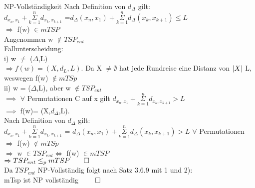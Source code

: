 \documentclass[answers]{submit}
\begin{document}
\begin{exercise}[7]{NP-Vollständigkeit}
{    Nach Definition von $d_{\Delta}$ gilt:  \\

  $d_{x_n,x_1} + \overset{n}{\underset{k=1}{\Sigma}} d_{x_k,x_{k+1}}$ =$d_{\Delta}(x_n,x_1) + \overset{n}{\underset{k=1}{\Sigma}} d_{\Delta}(x_k,x_{k+1}) \leq L$ \\

  $\Rightarrow$ f(w) $\in mTSP$ \\

    Angenommen w $ \notin TSP_{ent} $ \\

    Fallunterscheidung: \\

    i) w $\neq$ ($\Delta$,L) \\

  $\Rightarrow f(w)= (X,d_L,L)$. Da X $\neq \emptyset$ hat jede Rundreise eine Distanz von $\left\vert X \right\vert$ L, weswegen f(w) $\notin mTSp$ \\

    ii) w = ($\Delta$,L), aber w $\notin TSP_{ent}$ \\

  $\implies$ $\forall$ Permutationen C auf x gilt $ d_{x_n,x_1} + \overset{n}{\underset{k=1}{\Sigma}} d_{x_k,x_{k+1}} > L$ \\

  $\implies$ f(w)= (X,$d_{\Delta}$,L). \\

    Nach Definition von $d_{\Delta}$ gilt: \\

  $d_{x_n,x_1} + \overset{n}{\underset{k=1}{\Sigma}} d_{x_k,x_{k+1}}$ = $d_{\Delta}(x_n,x_1) + \overset{n}{\underset{k=1}{\Sigma}} d_{\Delta}(x_k,x_{k+1}) > L $ $\forall$ Permutationen \\

  $\Rightarrow$ f(w) $\notin mTSp$ \\

  $\Rightarrow$ w $ \in TSP_{ent} \iff$ f(w) $ \in mTSP$ \\

  $\Rightarrow TSP_{ent} \leq_p mTSP \qed$ \\

    Da $TSP_{ent}$ NP-Vollständig folgt nach Satz 3.6.9 mit 1 und 2): \\

    mTsp ist NP vollständig $\qed$ \\
  }
\end{exercise}
\end{document}
